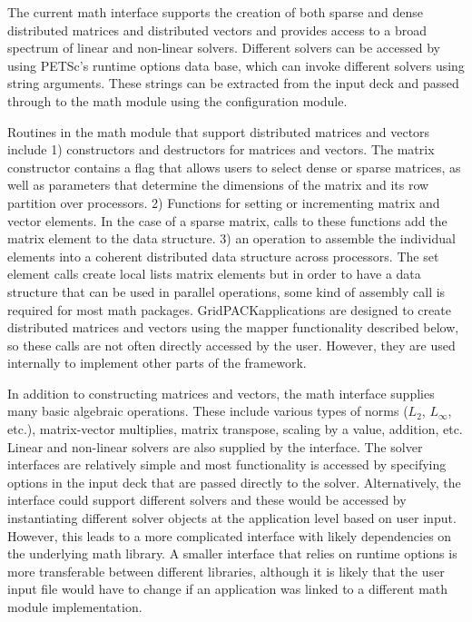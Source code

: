 \documentclass[preprint]{acm_proc_article-sp}
\begin{document}
The current math interface supports the creation of both sparse and dense
distributed matrices and distributed vectors and provides access to a broad
spectrum of linear and non-linear solvers. Different solvers can be accessed by
using PETSc's runtime options data base, which can invoke different solvers using
string arguments. These strings can be extracted from the input deck and passed
through to the math module using the configuration module.

Routines in the math module that support distributed matrices and vectors
include 1) constructors and destructors for
matrices and vectors. The matrix constructor contains a flag that allows users
to select dense or sparse matrices, as well as parameters that determine the
dimensions of the matrix and its row partition over processors. 2) Functions for
setting or incrementing matrix and vector elements. In the case of a sparse
matrix, calls to these functions add the matrix element to the data structure.
3) an operation to assemble the individual elements into a coherent distributed
data structure across processors. The set element calls create local
lists matrix elements but in order to have a data structure that can be used
in parallel operations, some kind of assembly call is required for most math
packages. GridPACK\texttrademark applications are designed to create distributed
matrices and vectors using the mapper functionality described below, so these
calls are not often directly accessed by the user. However, they are used
internally to implement other parts of the framework.

In addition to constructing matrices and vectors, the math interface supplies
many basic algebraic operations. These include various types of norms ($L_2$,
$L_{\infty}$, etc.), matrix-vector multiplies, matrix transpose, scaling by a
value, addition, etc. Linear and non-linear solvers are also supplied by the
interface. The solver interfaces are relatively simple and most functionality
is accessed by
specifying options in the input deck that are passed directly to the solver.
Alternatively, the interface could support different solvers and these would be
accessed by instantiating different solver objects at the application level
based on user input. However, this leads to a more complicated interface with
likely dependencies on the underlying math library. A smaller interface that
relies on runtime options is more transferable between different libraries,
although it is likely that the user input file would have to change if an
application was linked to a different math module implementation.
\end{document}
